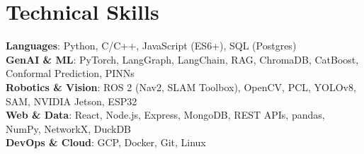 \documentclass[letterpaper,10pt]{article}
\begin{document}
\section{Technical Skills}
 \begin{itemize}[leftmargin=0.15in, label={}]
    \small{\item{
     \textbf{Languages}{: Python, C/C++, JavaScript (ES6+), SQL (Postgres)} \\
     \textbf{GenAI \& ML}{: PyTorch, LangGraph, LangChain, RAG, ChromaDB, CatBoost, Conformal Prediction, PINNs} \\
     \textbf{Robotics \& Vision}{: ROS 2 (Nav2, SLAM Toolbox), OpenCV, PCL, YOLOv8, SAM, NVIDIA Jetson, ESP32} \\
     \textbf{Web \& Data}{: React, Node.js, Express, MongoDB, REST APIs, pandas, NumPy, NetworkX, DuckDB} \\
     \textbf{DevOps \& Cloud}{: GCP, Docker, Git, Linux}
    }}
 \end{itemize}


\end{document}
